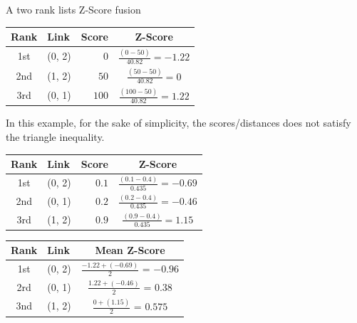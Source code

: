 \begin{example}[!t]
  \caption{A two rank lists Z-Score fusion}
  \label{ex:z_score_fusion}

  \begin{subexample}{\linewidth}
    \centering
    \begin{tabular}{c l r c}
      \toprule
      Rank & Link & Score & Z-Score \\
      \midrule
      1st & (0, 2) & $0$ & $\frac{(0-50)}{40.82}=-1.22$ \\
      2nd & (1, 2) & $50$ & $\frac{(50-50)}{40.82}=0$ \\
      3rd & (0, 1) & $100$ & $\frac{(100-50)}{40.82}=1.22$ \\
      \bottomrule
    \end{tabular}
  \end{subexample}

  \vspace{0.5cm}

  In this example, for the sake of simplicity, the scores/distances does not satisfy the triangle inequality.

  \vspace{0.5cm}

  \begin{subexample}{\linewidth}
    \centering
    \begin{tabular}{c l r c}
      \toprule
      Rank & Link & Score & Z-Score \\
      \midrule
      1st & (0, 2) & $0.1$ & $\frac{(0.1-0.4)}{0.435}=-0.69$ \\
      2nd & (0, 1) & $0.2$ & $\frac{(0.2-0.4)}{0.435}=-0.46$ \\
      3rd & (1, 2) & $0.9$ & $\frac{(0.9-0.4)}{0.435}=1.15$ \\
      \bottomrule
    \end{tabular}
  \end{subexample}

  \vspace{0.5cm}

  \begin{subexample}{\linewidth}
    \centering
    \begin{tabular}{c l c}
      \toprule
      Rank & Link & Mean Z-Score \\
      \midrule
      1st & (0, 2) & $\frac{-1.22 + (-0.69)}{2}$ = $-0.96$ \\
      2rd & (0, 1) & $\frac{1.22 + (-0.46)}{2}$ = $0.38$ \\
      3nd & (1, 2) & $\frac{0 + (1.15)}{2}$ = $0.575$ \\
      \bottomrule
    \end{tabular}
  \end{subexample}

\end{example}

